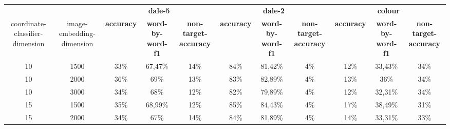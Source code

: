 \begin{table}[ht]
    \centering
    \begin{tabular}{cc|ccc|ccc|ccc}
        \toprule
                                        &                           & \multicolumn{3}{c}{\textbf{dale-5}} & \multicolumn{3}{c}{\textbf{dale-2}} & \multicolumn{3}{c}{\textbf{colour}}                                                                                                                                                             \\  \cmidrule(lr){3-5}\cmidrule(lr){6-8}\cmidrule(lr){9-11}
        coordinate-classifier-dimension & image-embedding-dimension & \textbf{accuracy}                   & \textbf{word-by-word-f1}            & \textbf{non-target-accuracy}        & \textbf{accuracy} & \textbf{word-by-word-f1} & \textbf{non-target-accuracy} & \textbf{accuracy} & \textbf{word-by-word-f1} & \textbf{non-target-accuracy} \\\midrule
        {10}                            & {1500}                    & {33\%}                              & {67,47\%}                           & {14\%}                              & {84\%}            & {81,42\%}                & {4\%}                        & {12\%}            & {33,43\%}                & {34\%}                       \\
        {10}                            & {2000}                    & {36\%}                              & {69\%}                              & {13\%}                              & {83\%}            & {82,89\%}                & {4\%}                        & {13\%}            & {36\%}                   & {34\%}                       \\
        {10}                            & {3000}                    & {34\%}                              & {68\%}                              & {12\%}                              & {82\%}            & {79,89\%}                & {4\%}                        & {12\%}            & {32,31\%}                & {34\%}                       \\
        {15}                            & {1500}                    & {35\%}                              & {68,99\%}                           & {12\%}                              & {85\%}            & {84,43\%}                & {4\%}                        & {17\%}            & {38,49\%}                & {31\%}                       \\
        {15}                            & {2000}                    & {34\%}                              & {67\%}                              & {14\%}                              & {84\%}            & {81,89\%}                & {4\%}                        & {14\%}            & {33,31\%}                & {33\%}                       \\

\end{tabular}
\end{table}
